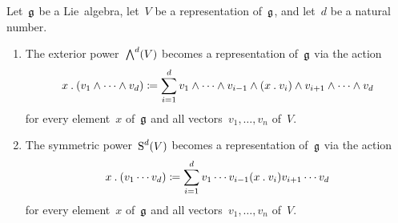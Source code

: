 \begin{lemma}
  Let~$\mathfrak{g}$ be a Lie~algebra, let~$V$ be a representation of~$\mathfrak{g}$, and let~$d$ be a natural number.
  \begin{enumerate}
    \item
      The exterior power~$\operatorname{\bigwedge}^d(V)$ becomes a representation of~$\mathfrak{g}$ via the action
      \[
        x \mathbin{.} (v_1 \wedge \dotsb \wedge v_d)
        \coloneqq
        \sum_{i=1}^d
        v_1 \wedge \dotsb \wedge v_{i-1} \wedge (x \mathbin{.} v_i) \wedge v_{i+1} \wedge \dotsb \wedge v_d
      \]
      for every element~$x$ of~$\mathfrak{g}$ and all vectors~$v_1, \dotsc, v_n$ of~$V$.
    \item
      The symmetric power~$\operatorname{S}^d(V)$ becomes a representation of~$\mathfrak{g}$ via the action
      \[
        x \mathbin{.} (v_1 \dotsm v_d)
        \coloneqq
        \sum_{i=1}^d
        v_1 \dotsm v_{i-1} (x \mathbin{.} v_i) v_{i+1} \dotsm v_d
      \]
      for every element~$x$ of~$\mathfrak{g}$ and all vectors~$v_1, \dotsc, v_n$ of~$V$.
  \end{enumerate}
\end{lemma}


